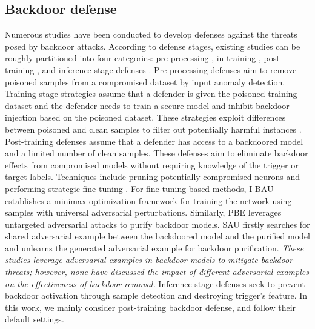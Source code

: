 \subsection{Backdoor defense}
Numerous studies \cite{wu2023defenses,niu2024towards} have been conducted to develop defenses against the threats posed by backdoor attacks. According to defense stages, existing studies can be roughly partitioned into four categories: pre-processing \cite{chen2022effective,zhu2024vdc}, in-training \cite{li2021anti,huang2022backdoor}, post-training \cite{wang2019neural,li2021neural}, and inference stage defenses \cite{guoscale,chou2020sentinet}. 
Pre-processing defenses aim to remove poisoned samples from a compromised dataset by input anomaly detection. 
Training-stage strategies assume that a defender is given the poisoned training dataset and the defender needs to train a secure model and inhibit backdoor injection based on the poisoned dataset. These strategies exploit differences between poisoned and clean samples to filter out potentially harmful instances \cite{chen2022effective}. 
Post-training defenses assume that a defender has access to a backdoored model and a limited number of clean samples. These defenses aim to eliminate backdoor effects from compromised models without requiring knowledge of the trigger or target labels. Techniques include pruning potentially compromised neurons \cite{liu2018fine,zheng2022pre} and performing strategic fine-tuning \cite{zeng2022adversarial,zhu2023enhancing}. For fine-tuning based methods, I-BAU \cite{zeng2022adversarial} establishes a minimax optimization framework for training the network using samples with universal adversarial perturbations. Similarly, PBE \cite{mu2023progressive} leverages untargeted adversarial attacks to purify backdoor models. SAU \cite{wei2023shared} firstly searches for shared adversarial example between the backdoored model and the purified model and unlearns the generated adversarial example for backdoor purification. 
\textit{These studies leverage adversarial examples in backdoor models to mitigate backdoor threats; however, none have discussed the impact of different adversarial examples on the effectiveness of backdoor removal.}
Inference stage defenses seek to prevent backdoor activation through sample detection and destroying trigger's feature. 
In this work, we mainly consider post-training backdoor defense, and follow their default settings.

